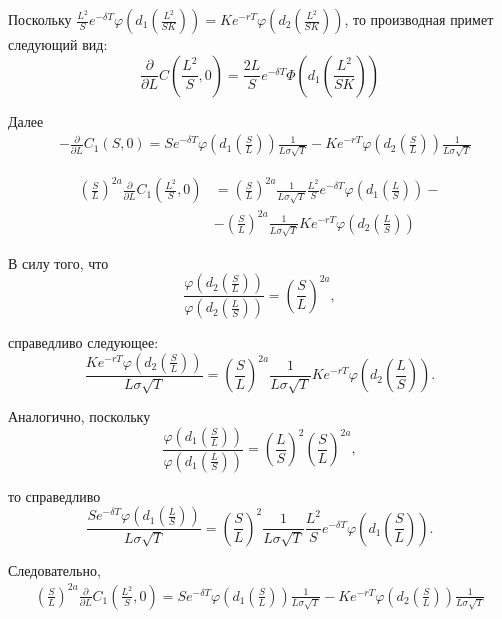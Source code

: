 \documentclass[oneside,final,12pt]{article}
\begin{document}
Поскольку $\frac{L^2}{S}e^{-\delta T}\varphi\left(d_1\left( \frac{L^2}{SK}\right) \right) = Ke^{-rT} \varphi\left(d_2\left( \frac{L^2}{SK}\right) \right)$, то производная примет следующий вид:
$$
\frac{\partial}{\partial L} C\left(\frac{L^2}{S},0\right) = \frac{2L}{S}e^{-\delta T} \Phi \left( d_1\left( \frac{L^2}{SK}\right)\right)
$$

Далее
\begin{align*}
    & -\frac{\partial}{\partial L} C_1\left(S,0\right) = 
    Se^{-\delta T} \varphi \left( d_1\left( \frac{S}{L}\right)\right)\frac{1}{L\sigma\sqrt{T}}  - Ke^{-rT} \varphi \left( d_2\left( \frac{S}{L}\right)\right)\frac{1}{L\sigma\sqrt{T}}
\end{align*}

\begin{align*}
    \left( \frac{S}{L} \right)^{2a} \frac{\partial}{\partial L} C_1\left(\frac{L^2}{S},0\right) & = \left( \frac{S}{L} \right)^{2a} \frac{1}{L\sigma\sqrt{T}} \frac{L^2}{S} e^{-\delta T} \varphi \left( d_1\left( \frac{L}{S}\right)\right) - \\
    & - \left( \frac{S}{L} \right)^{2a}  \frac{1}{L\sigma\sqrt{T}} Ke^{-rT} \varphi \left( d_2\left( \frac{L}{S}\right)\right)
\end{align*}

В силу того, что 
$$ \frac{\varphi \left( d_2\left( \frac{S}{L}\right) \right)}
        {\varphi \left( d_2\left( \frac{L}{S}\right) \right)} =
    \left( \frac{S}{L} \right)^{2a},
$$

\noindent
справедливо следующее:
$$
\frac{Ke^{-rT} \varphi \left( d_2\left( \frac{S}{L}\right)\right)}{L\sigma\sqrt{T}} =
\left( \frac{S}{L} \right)^{2a} \frac{1}{L\sigma\sqrt{T}} Ke^{-rT} \varphi \left( d_2\left( \frac{L}{S}\right)\right).
$$

Аналогично, поскольку
$$ \frac{\varphi \left( d_1\left( \frac{S}{L}\right) \right)}
        {\varphi \left( d_1\left( \frac{L}{S}\right) \right)} =
    \left(\frac{L}{S}\right)^2
    \left( \frac{S}{L} \right)^{2a},
$$

\noindent
то справедливо
$$
\frac{Se^{-\delta T} \varphi \left( d_1\left( \frac{L}{S}\right) \right) }{L\sigma\sqrt{T}} =
\left(\frac{S}{L}\right)^2 \frac{1}{L\sigma\sqrt{T}} \frac{L^2}{S} e^{-\delta T} \varphi \left( d_1\left( \frac{S}{L}\right) \right).
$$

Следовательно, 
\begin{align*}
    \left( \frac{S}{L} \right)^{2a} \frac{\partial}{\partial L} C_1\left(\frac{L^2}{S},0\right) = Se^{-\delta T} \varphi \left( d_1\left( \frac{S}{L}\right)\right)\frac{1}{L\sigma\sqrt{T}}  - Ke^{-rT} \varphi \left( d_2\left( \frac{S}{L}\right)\right)\frac{1}{L\sigma\sqrt{T}}
\end{align*}
\end{document}
